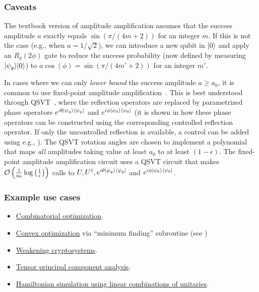 \begin{refsection}

\subsubsection*{Caveats}
The textbook version of amplitude amplification assumes that the success amplitude $a$ exactly equals  $\sin\left(\pi/(4m+2)\right)$ for an integer $m$. If this is not the case (e.g., when $a= 1/\sqrt{2}$), we can introduce a new qubit in $\lvert0\rangle$ and apply an $R_y(2\phi)$ gate to reduce the success probability (now defined by measuring $\lvert\psi_g\rangle\lvert0\rangle$) to $a \cos(\phi) = \sin\left(\pi/(4m'+2) \right)$ for an integer $m'$. 

In cases where we can only \textit{lower bound} the success amplitude $a \ge a_0$, it is common to use fixed-point amplitude amplification~\cite{yoder2014FixedPointSearch}. This is best understood through QSVT~\cite[Theorem 27]{gilyen2018QSingValTransfArXiv}, where the reflection operators are replaced by parametrized phase operators $e^{i \theta \lvert\psi_g\rangle\langle\psi_g\rvert}$ and $e^{i \phi \lvert\psi_0\rangle\langle\psi_0\rvert}$ (it is shown in \cite[Section 8.5]{lin2022LectureNotes} how these phase operators can be constructed using the corresponding controlled reflection operator. If only the uncontrolled reflection is available, a control can be added using e.g., \cite[Fig.5]{martyn2021GrandUnificationQAlgs}). The QSVT rotation angles are chosen to implement a polynomial that maps \textit{all} amplitudes taking value at least $a_0$ to at least $(1-\epsilon)$. The fixed-point amplitude amplification circuit uses a QSVT circuit that makes $\mathcal{O}\left( \frac{1}{a_0} \log\left(\frac{1}{\epsilon}\right) \right)$ calls to $U, U^\dag, e^{i \theta \lvert\psi_g\rangle\langle\psi_g\rvert}$ and $e^{i \phi \lvert\psi_0\rangle\langle\psi_0\rvert}$.




\subsubsection*{Example use cases}

\begin{itemize}
    \item \hyperref[appl:CombOpt]{Combinatorial optimization}.
    \item \hyperref[appl:ContinuousOpt]{Convex optimization} via ``minimum finding'' subroutine (see \cite[Appendix C]{apeldoorn2017QSDPSolvers})
    \item \hyperref[appl:WeakeningCrypto]{Weakening cryptosystems}.
    \item \hyperref[appl:TPCA]{Tensor principal component analysis}.
    \item \hyperref[prim:TaylorDyson]{Hamiltonian simulation using linear combinations of unitaries}.
\end{itemize}


\end{refsection}
